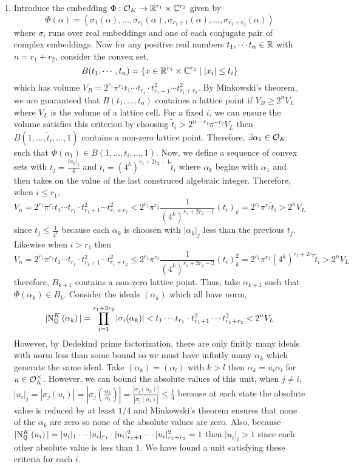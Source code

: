 \documentclass[12pt]{extarticle}
\begin{document}
\begin{enumerate}
\begin{enumerate}
\item Introduce the embedding $\Phi : \mathcal{O}_{K} \to \mathbb{R}^{r_1} \times \mathbb{C}^{r_2}$ given by 
\[ \Phi(\alpha) = (\sigma_1(\alpha), \dots, \sigma_{r_1}(\alpha), \sigma_{r_1 + 1}(\alpha), \dots, \sigma_{r_1 + r_2}(\alpha))\]
where $\sigma_i$ runs over real embeddings and one of each conjugate pair of complex embeddings. Now for any positive real numbers $t_1, \cdots t_n \in \mathbb{R}$ with $n = r_1 + r_2$, consider the convex set,
\[B(t_1, \cdots, t_n) = \{x \in \mathbb{R}^{r_1} \times \mathbb{C}^{r_2} \mid |x_i| \le t_i \}\]
which has volume $V_B = 2^{r_1} \pi^{r_2} t_1 \cdots t_{r_1} \cdot t_{r_1 + 1}^2 \cdots t_{r_1 + r_2}^2$. By Minkowski's theorem, we are guaranteed that $B(t_1, \dots, t_n)$ containes a lattice point if $V_B \ge 2^n V_L$ where $V_L$ is the volume of a lattice cell. For a fixed $i$, we can ensure the volume satisfies this criterion by choosing $\tilde{t}_i > 2^{n - r_1} \pi^{-r_2} V_L$ then $B(1, \dots, \tilde{t}_i, \dots, 1)$ contains a non-zero lattice point. Therefore, $\exists \alpha_1 \in \mathcal{O}_{K}$ such that $\Phi(\alpha_1) \in B(1, \dots, t_i, \dots, 1)$. Now, we define a sequence of convex sets with $t_j = \frac{|\alpha_k|_j}{4}$ and $t_i = (4^k)^{r_1 + 2 r_2 - 1} \tilde{t}_i$ where $\alpha_k$ begins with $\alpha_1$ and then takes on the value of the last construced algebraic integer. Therefore, when $i \le r_1$,
\[V_{n} = 2^{r_1} \pi^{r_2} t_1 \cdots t_{r_1} \cdot t_{r_1 + 1}^2 \cdots t_{r_1 + r_2}^2 < 2^{r_1} \pi^{r_2} \frac{1}{(4^k)^{r_1 + 2 r_2 - 1}} (t_i)_k = 2^{r_1} \pi^{r_2} \tilde{t}_i > 2^n V_L\]  
since $t_j \le \frac{1}{4^k}$ because each $\alpha_k$ is choosen with $|\alpha_k|_j$ less than the previous $t_j$. Likewise when $i > r_1$ then
\[V_{n} = 2^{r_1} \pi^{r_2} t_1 \cdots t_{r_1} \cdot t_{r_1 + 1}^2 \cdots t_{r_1 + r_2}^2 \le 2^{r_1} \pi^{r_2} \frac{1}{(4^k)^{r_1 + 2 r_2 - 2}} (t_i)_k^2 = 2^{r_1} \pi^{r_2} (4^k)^{r_1 + 2 r_2} \tilde{t}_i > 2^n V_L\]  
therefore, $B_{k+1}$ contains a non-zero lattice point. Thus, take $\alpha_{k+1}$ such that $\Phi(\alpha_k) \in B_k$. Consider the ideals $(\alpha_k)$ which all have norm, 
\[|\mathrm{N}^{K}_{\mathbb{Q}}\left(\alpha_k\right)| = \prod\limits_{i = 1}^{r_1 + 2 r_2} |\sigma_i(\alpha_k)| < t_1 \cdots t_{r_1} \cdot t_{r_1 + 1}^2 \cdots t_{r_1 + r_2}^2 < 2^n V_{L} \] 
However, by Dedekind prime factorization, there are only finitly many ideals with norm less than some bound so we must have infintly many $\alpha_k$ which generate the same ideal. Take $(\alpha_k) = (\alpha_l)$  with $k > l$ then $\alpha_k = u_i \alpha_l$ for $u \in \mathcal{O}_{K}^\times$. However, we can bound the absolute values of this unit, when $j \neq i$,
$|u_i|_j = |\sigma_j(u_i)| = |\sigma_j(\tfrac{\alpha_k}{\alpha_l})| = \frac{|\sigma_j(\alpha_k)|}{|\sigma_j(\alpha_l)|} \le \frac{1}{4}$ because at each state the absolute value is reduced by at least $1/4$ and Minkowski's theorem ensures that none of the $\alpha_k$ are zero so none of the absolute values are zero. Also, because $|\mathrm{N}^{K}_{\mathbb{Q}}\left(u_i\right)| = |u_i|_1 \cdots |u_i|_{r_1} \cdot |u_i|_{r_1 + 1}^2 \cdots |u_i|_{r_1 + r_2}^2 = 1$ then $|u_i|_i > 1$ since each other absolute value is less than $1$. We have found a unit satisfying these criteria for each $i$. 
         

\end{enumerate}
\end{enumerate}
\end{document}
